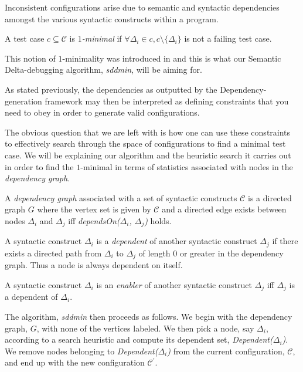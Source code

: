 \documentclass[preprint]{acm_proc_article-sp}
\newenvironment{definition}[1][Definition]{\begin{trivlist}
\item[\hskip \labelsep {\bfseries #1}]}{\end{trivlist}}
\begin{document}
Inconsistent configurations arise due to semantic and syntactic dependencies
amongst the various syntactic constructs within a program.

\begin{definition}
A test case $c \subseteq \mathcal{C}$ is \emph{$1$-minimal} if $\forall \Delta_i
\in c, c \setminus \{ \Delta_i \}$ is not a failing test case.
\end{definition}

This notion of $1$-minimality was introduced in \citep{zeller99} and this is
what our Semantic Delta-debugging algorithm, \emph{sddmin}, will be aiming
for. 

As stated previously, the dependencies as outputted by the Dependency-generation
framework may then be interpreted as defining constraints that you need to obey
in order to generate valid configurations.

The obvious question that we are left with is how one can use these constraints
to effectively search through the space of configurations to find a minimal test
case. We will be explaining our algorithm and the heuristic search it carries
out in order to find the $1$-minimal in terms of statistics associated with
nodes in the \emph{dependency graph}.

\begin{definition}
A \emph{dependency graph} associated with a set of syntactic constructs
$\mathcal{C}$ is a directed graph $G$ where the vertex set is given by
$\mathcal{C}$ and a directed edge exists between nodes $\Delta_i$ and $\Delta_j$
iff \emph{dependsOn($\Delta_i$, $\Delta_j$)} holds.
\end{definition}

\begin{definition}
A syntactic construct $\Delta_i$ is a \emph{dependent} of another syntactic
construct $\Delta_j$ if there exists a directed path from $\Delta_i$ to
$\Delta_j$ of length $0$ or greater in the dependency graph. Thus a node is
always dependent on itself.
\end{definition}

\begin{definition}
A syntactic construct $\Delta_i$ is an \emph{enabler} of another syntactic
construct $\Delta_j$ iff $\Delta_j$ is a dependent of $\Delta_i$.
\end{definition}

The algorithm, \emph{sddmin} then proceeds as follows. We begin with the
dependency graph, $G$, with none of the vertices labeled. We then pick a node,
say $\Delta_i$, according to a search heuristic and compute its dependent set,
\emph{Dependent($\Delta_i$)}. We remove nodes belonging to
\emph{Dependent($\Delta_i$)} from the current configuration, $\mathcal{C}$, and
end up with the new configuration $\mathcal{C}^{'}$. 
\end{document}
